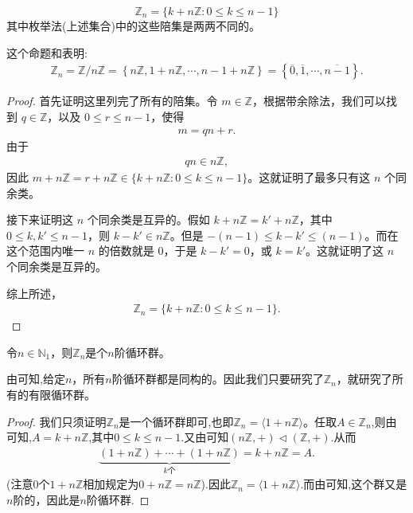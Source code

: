\documentclass[../../main.tex]{subfiles}
\begin{document}
\begin{proposition}\label{proposition:枚举Z_n的所有元素}
\[
\mathbb{Z}_n = \{k + n\mathbb{Z} : 0\leqslant k\leqslant n - 1\}
\]
其中枚举法(上述集合)中的这些陪集是两两不同的。
\end{proposition}
\begin{note}
这个命题和表明:
\begin{align*}
\mathbb{Z} _n=\mathbb{Z} /n\mathbb{Z} =\left\{ n\mathbb{Z} ,1+n\mathbb{Z} ,\cdots ,n-1+n\mathbb{Z} \right\} =\left\{ \overline{0},\overline{1},\cdots ,\overline{n-1} \right\} .
\end{align*}
\end{note}
\begin{proof}
首先证明这里列完了所有的陪集。令 $m\in\mathbb{Z}$，根据带余除法，我们可以找到 $q\in\mathbb{Z}$，以及 $0\leqslant r\leqslant n - 1$，使得
\begin{align*}
m = qn + r .
\end{align*}
由于
\begin{align*}
qn\in n\mathbb{Z},
\end{align*}
因此 $m + n\mathbb{Z}=r + n\mathbb{Z}\in\{k + n\mathbb{Z} : 0\leqslant k\leqslant n - 1\}$。这就证明了最多只有这 $n$ 个同余类。

接下来证明这 $n$ 个同余类是互异的。假如 $k + n\mathbb{Z}=k' + n\mathbb{Z}$，其中 $0\leqslant k,k'\leqslant n - 1$，则 $k - k'\in n\mathbb{Z}$。但是 $-(n - 1)\leqslant k - k'\leqslant (n - 1)$。而在这个范围内唯一 $n$ 的倍数就是 $0$，于是 $k - k' = 0$，或 $k = k'$。这就证明了这 $n$ 个同余类是互异的。

综上所述，
\begin{align*}
\mathbb{Z}_n = \{k + n\mathbb{Z} : 0\leqslant k\leqslant n - 1\}.
\end{align*} 
\end{proof}

\begin{proposition}
令$n \in \mathbb{N}_1$，则$\mathbb{Z}_n$是个$n$阶循环群。  
\end{proposition}
\begin{note}
由可知,给定$n$，所有$n$阶循环群都是同构的。因此我们只要研究了$\mathbb{Z}_n$，就研究了所有的有限循环群。 
\end{note}
\begin{proof}
我们只须证明$\mathbb{Z}_n $是一个循环群即可,也即$\mathbb{Z}_n = \langle 1 + n\mathbb{Z} \rangle$。任取$A\in \mathbb{Z}_n$,则由可知,$A=k+n\mathbb{Z}$,其中$0\leq k\leq n-1$.又由可知$(n\mathbb{Z},+)\lhd (\mathbb{Z},+)$.从而
\begin{align*}
\underset{k\text{个}}{\underbrace{\left( 1+n\mathbb{Z} \right) +\cdots +\left( 1+n\mathbb{Z} \right) }}=k+n\mathbb{Z} =A.
\end{align*}
(注意$0$个$1 + n\mathbb{Z}$相加规定为$0 + n\mathbb{Z} = n\mathbb{Z}$).因此$\mathbb{Z}_n = \langle 1 + n\mathbb{Z} \rangle$.而由可知,这个群又是$n$阶的，因此是$n$阶循环群.
\end{proof}
\end{document}
